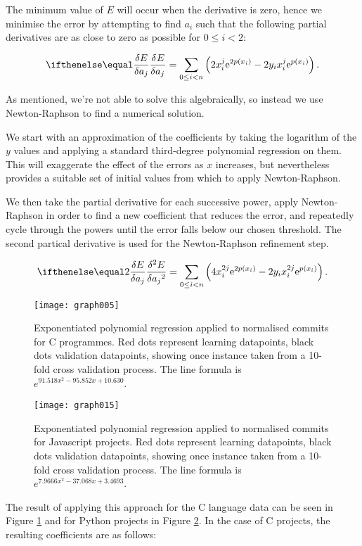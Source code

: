 \documentclass[10pt,journal,compsoc]{IEEEtran}
\begin{document}
The minimum value of $E$ will occur when the derivative is zero, hence we minimise the error by attempting to find $a_i$ such that the following partial derivatives are as close to zero as possible for $0 \le i < 2$:

$$
\partdiff{E}{a_j} = \sum_{0 \le i < n} \left( 2 x_i^j \esup{2 p(x_i)} - 2 y_i x_i^j \esup{p(x_i)} \right) .
$$

As mentioned, we're not able to solve this algebraically, so instead we use Newton-Raphson to find a numerical solution.


We start with an approximation of the coefficients by taking the logarithm of the $y$ values and applying a standard third-degree polynomial regression on them. This will exaggerate the effect of the errors as $x$ increases, but nevertheless provides a suitable set of initial values from which to apply Newton-Raphson.

We then take the partial derivative for each successive power, apply Newton-Raphson in order to find a new coefficient that reduces the error, and repeatedly cycle through the powers until the error falls below our chosen threshold. The second partical derivative is used for the Newton-Raphson refinement step.

$$
\partdiff[2]{E}{a_j} = \sum_{0 \le i < n} \left( 4 x_i^{2j} \esup{2 p(x_i)} - 2 y_i x_i^{2j} \esup{p(x_i)} \right) .
$$

\begin{figure}[t]
\centering
\texttt{[image: graph005]}%
\caption{\label{fig:c-exp}Exponentiated polynomial regression applied to normalised commits for C programmes. Red dots represent learning datapoints, black dots validation datapoints, showing once instance taken from a 10-fold cross validation process. The line formula is $e^{91.518 x^{2} - 95.852 x + 10.630}$.}
\end{figure}

\begin{figure}[t]
\centering
\texttt{[image: graph015]}%
\caption{\label{fig:javascript-exp}Exponentiated polynomial regression applied to normalised commits for Javascript projects. Red dots represent learning datapoints, black dots validation datapoints, showing once instance taken from a 10-fold cross validation process. The line formula is $e^{7.9666 x^{2} - 37.068 x + 3.4693}$.}
\end{figure}

The result of applying this approach for the C language data can be seen in Figure \ref{fig:c-exp} and for Python projects in Figure \ref{fig:javascript-exp}. In the case of C projects, the resulting coefficients are as follows:
\end{document}
